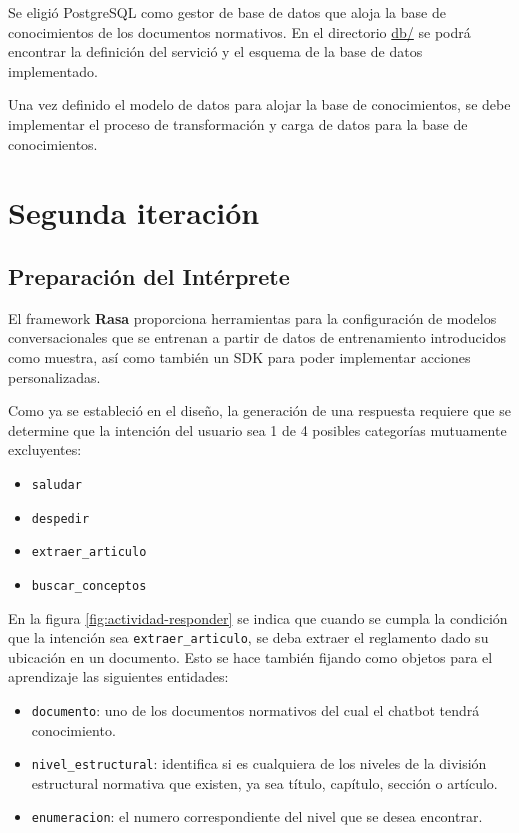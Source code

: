 Se eligió PostgreSQL como gestor de base de datos que aloja la base de conocimientos de los documentos normativos. En el directorio \href{https://github.com/AranGarcia/milo-bot/tree/master/db}{db/} se podrá encontrar la definición del servició y el esquema de la base de datos implementado.

Una vez definido el modelo de datos para alojar la base de conocimientos, se debe implementar el proceso de transformación y carga de datos para la base de conocimientos.

\section{Segunda iteración}  

\subsection{Preparación del Intérprete}

El framework \textbf{Rasa} proporciona herramientas para la configuración de modelos conversacionales que se entrenan a partir de datos de entrenamiento introducidos como muestra, así como también un SDK para poder implementar acciones personalizadas.

Como ya se estableció en el diseño, la generación de una respuesta requiere que se determine que la intención del usuario sea 1 de 4 posibles categorías mutuamente excluyentes:

\begin{itemize}
    \item \verb|saludar|
    \item \verb|despedir|
    \item \verb|extraer_articulo|
    \item \verb|buscar_conceptos|
\end{itemize}

En la figura \ref{fig:actividad-responder} se indica que cuando se cumpla la condición que la intención sea \verb|extraer_articulo|, se deba extraer el reglamento dado su ubicación en un documento. Esto se hace también fijando como objetos para el aprendizaje las siguientes entidades:

\begin{itemize}
    \item \verb|documento|: uno de los documentos normativos del cual el chatbot tendrá conocimiento.
    \item \verb|nivel_estructural|: identifica si es cualquiera de los niveles de la división estructural normativa que existen, ya sea título, capítulo, sección o artículo.
    \item \verb|enumeracion|: el numero correspondiente del nivel que se desea encontrar.
\end{itemize}

